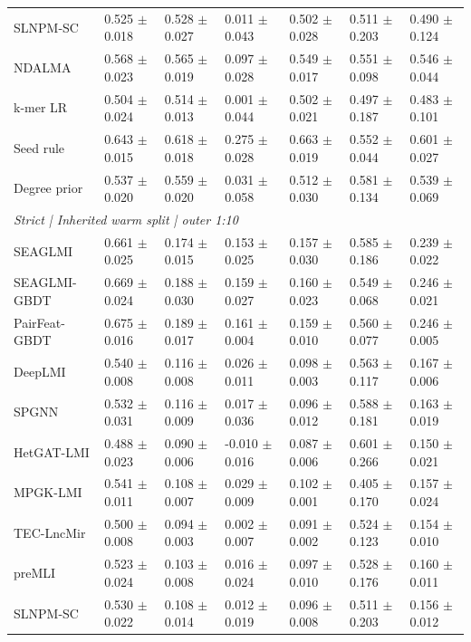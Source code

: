\begin{landscape}
{\begin{longtable}{lllllll}
SLNPM-SC & 0.525 $\pm$ 0.018 & 0.528 $\pm$ 0.027 & 0.011 $\pm$ 0.043 & 0.502 $\pm$ 0.028 & 0.511 $\pm$ 0.203 & 0.490 $\pm$ 0.124 \\
NDALMA & 0.568 $\pm$ 0.023 & 0.565 $\pm$ 0.019 & 0.097 $\pm$ 0.028 & 0.549 $\pm$ 0.017 & 0.551 $\pm$ 0.098 & 0.546 $\pm$ 0.044 \\
k-mer LR & 0.504 $\pm$ 0.024 & 0.514 $\pm$ 0.013 & 0.001 $\pm$ 0.044 & 0.502 $\pm$ 0.021 & 0.497 $\pm$ 0.187 & 0.483 $\pm$ 0.101 \\
Seed rule & 0.643 $\pm$ 0.015 & 0.618 $\pm$ 0.018 & 0.275 $\pm$ 0.028 & 0.663 $\pm$ 0.019 & 0.552 $\pm$ 0.044 & 0.601 $\pm$ 0.027 \\
Degree prior & 0.537 $\pm$ 0.020 & 0.559 $\pm$ 0.020 & 0.031 $\pm$ 0.058 & 0.512 $\pm$ 0.030 & 0.581 $\pm$ 0.134 & 0.539 $\pm$ 0.069 \\
\multicolumn{7}{l}{\textit{Strict | Inherited warm split | outer 1:10}}\\
SEAGLMI & 0.661 $\pm$ 0.025 & 0.174 $\pm$ 0.015 & 0.153 $\pm$ 0.025 & 0.157 $\pm$ 0.030 & 0.585 $\pm$ 0.186 & 0.239 $\pm$ 0.022 \\
SEAGLMI-GBDT & 0.669 $\pm$ 0.024 & 0.188 $\pm$ 0.030 & 0.159 $\pm$ 0.027 & 0.160 $\pm$ 0.023 & 0.549 $\pm$ 0.068 & 0.246 $\pm$ 0.021 \\
PairFeat-GBDT & 0.675 $\pm$ 0.016 & 0.189 $\pm$ 0.017 & 0.161 $\pm$ 0.004 & 0.159 $\pm$ 0.010 & 0.560 $\pm$ 0.077 & 0.246 $\pm$ 0.005 \\
DeepLMI & 0.540 $\pm$ 0.008 & 0.116 $\pm$ 0.008 & 0.026 $\pm$ 0.011 & 0.098 $\pm$ 0.003 & 0.563 $\pm$ 0.117 & 0.167 $\pm$ 0.006 \\
SPGNN & 0.532 $\pm$ 0.031 & 0.116 $\pm$ 0.009 & 0.017 $\pm$ 0.036 & 0.096 $\pm$ 0.012 & 0.588 $\pm$ 0.181 & 0.163 $\pm$ 0.019 \\
HetGAT-LMI & 0.488 $\pm$ 0.023 & 0.090 $\pm$ 0.006 & -0.010 $\pm$ 0.016 & 0.087 $\pm$ 0.006 & 0.601 $\pm$ 0.266 & 0.150 $\pm$ 0.021 \\
MPGK-LMI & 0.541 $\pm$ 0.011 & 0.108 $\pm$ 0.007 & 0.029 $\pm$ 0.009 & 0.102 $\pm$ 0.001 & 0.405 $\pm$ 0.170 & 0.157 $\pm$ 0.024 \\
TEC-LncMir & 0.500 $\pm$ 0.008 & 0.094 $\pm$ 0.003 & 0.002 $\pm$ 0.007 & 0.091 $\pm$ 0.002 & 0.524 $\pm$ 0.123 & 0.154 $\pm$ 0.010 \\
preMLI & 0.523 $\pm$ 0.024 & 0.103 $\pm$ 0.008 & 0.016 $\pm$ 0.024 & 0.097 $\pm$ 0.010 & 0.528 $\pm$ 0.176 & 0.160 $\pm$ 0.011 \\
SLNPM-SC & 0.530 $\pm$ 0.022 & 0.108 $\pm$ 0.014 & 0.012 $\pm$ 0.019 & 0.096 $\pm$ 0.008 & 0.511 $\pm$ 0.203 & 0.156 $\pm$ 0.012 \\

\end{longtable}}
\end{landscape}
